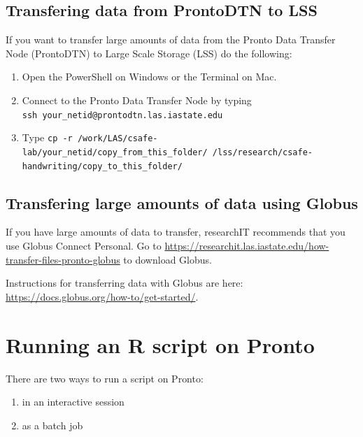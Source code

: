 \documentclass[
]{book}
\providecommand{\tightlist}{%
  \setlength{\itemsep}{0pt}\setlength{\parskip}{0pt}}
\begin{document}
\hypertarget{transfering-data-from-prontodtn-to-lss}{%
\subsection{Transfering data from ProntoDTN to LSS}\label{transfering-data-from-prontodtn-to-lss}}

If you want to transfer large amounts of data from the Pronto Data Transfer Node (ProntoDTN) to Large Scale Storage (LSS) do the following:

\begin{enumerate}
\def\labelenumi{\arabic{enumi}.}
\tightlist
\item
  Open the PowerShell on Windows or the Terminal on Mac.
\item
  Connect to the Pronto Data Transfer Node by typing \texttt{ssh\ your\_netid@prontodtn.las.iastate.edu}
\item
  Type \texttt{cp\ -r\ /work/LAS/csafe-lab/your\_netid/copy\_from\_this\_folder/\ /lss/research/csafe-handwriting/copy\_to\_this\_folder/}
\end{enumerate}

\hypertarget{transfering-large-amounts-of-data-using-globus}{%
\subsection{Transfering large amounts of data using Globus}\label{transfering-large-amounts-of-data-using-globus}}

If you have large amounts of data to transfer, researchIT recommends that you use Globus Connect Personal. Go to \url{https://researchit.las.iastate.edu/how-transfer-files-pronto-globus} to download Globus.

Instructions for transferring data with Globus are here: \url{https://docs.globus.org/how-to/get-started/}.

\hypertarget{running-an-r-script-on-pronto}{%
\section{Running an R script on Pronto}\label{running-an-r-script-on-pronto}}

There are two ways to run a script on Pronto:

\begin{enumerate}
\def\labelenumi{\arabic{enumi}.}
\tightlist
\item
  in an interactive session
\item
  as a batch job
\end{enumerate}
\end{document}
